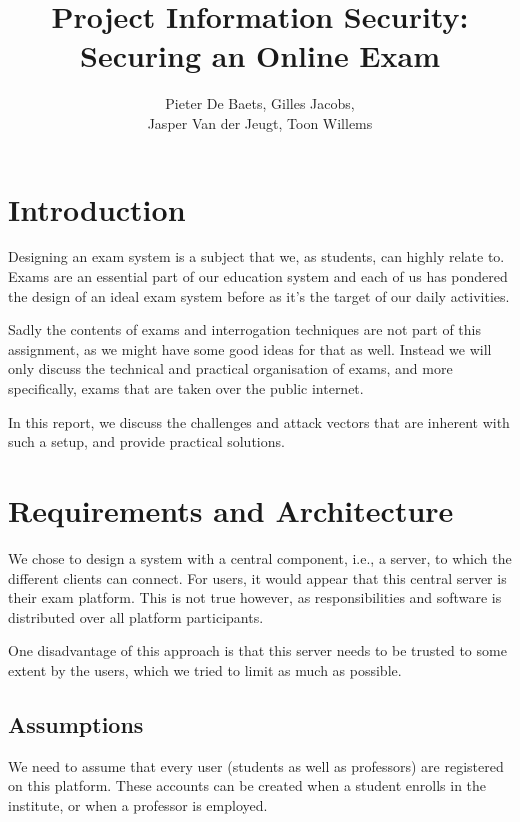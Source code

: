\documentclass[12pt]{article}
\title{Project Information Security: \\ \textbf{Securing an Online Exam}}
\author{Pieter De Baets, Gilles Jacobs,\\ Jasper Van der Jeugt, Toon Willems}
\begin{document}
\maketitle
\tableofcontents

\newpage

\section{Introduction}
\label{sec:introduction}

Designing an exam system is a subject that we, as students, can highly relate
to. Exams are an essential part of our education system and each of us has
pondered the design of an ideal exam system before as it's the target of our
daily activities.

Sadly the contents of exams and interrogation techniques are not part of this
assignment, as we might have some good ideas for that as well. Instead we will
only discuss the technical and practical organisation of exams, and more
specifically, exams that are taken over the public internet.

In this report, we discuss the challenges and attack vectors that are inherent
with such a setup, and provide practical solutions.

\section{Requirements and Architecture}
\label{sec:requirements}

We chose to design a system with a central component, i.e., a server, to which
the different clients can connect. For users, it would appear that this central
server is their exam platform. This is not true however, as responsibilities and
software is distributed over all platform participants.

One disadvantage of this approach is that this server needs to be trusted to
some extent by the users, which we tried to limit as much as possible.

\subsection{Assumptions}
\label{subsec:req-assumptions}

We need to assume that every user (students as well as professors) are
registered on this platform. These accounts can be created when a student
enrolls in the institute, or when a professor is employed.
\end{document}

